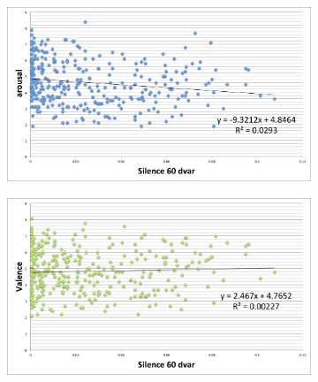 \begin{figure}
         \centering
        \begin{subfigure}[b]{0.48\textwidth}
                \includegraphics[width=\textwidth]{Figures/silence60dvar-arousal}
			   \vspace{20pt}
        \end{subfigure}
        \begin{subfigure}[b]{0.48\textwidth}
                \includegraphics[width=\textwidth]{Figures/silence60dvar-valence}
                  \vspace{20pt}
        \end{subfigure}
        

\end{figure}
